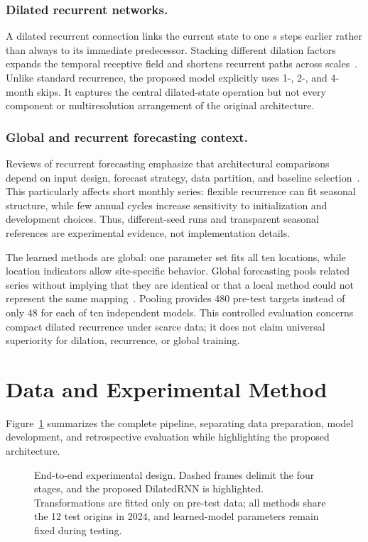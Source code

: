\documentclass[runningheads]{llncs}
\begin{document}
\subsubsection{Dilated recurrent networks.}
A dilated recurrent connection links the current state to one $s$ steps earlier rather than always to its immediate predecessor. Stacking different dilation factors expands the temporal receptive field and shortens recurrent paths across scales~\cite{chang2017}. Unlike standard recurrence, the proposed model explicitly uses 1-, 2-, and 4-month skips. It captures the central dilated-state operation but not every component or multiresolution arrangement of the original architecture.

\subsubsection{Global and recurrent forecasting context.}
Reviews of recurrent forecasting emphasize that architectural comparisons depend on input design, forecast strategy, data partition, and baseline selection~\cite{hewamalage2021}. This particularly affects short monthly series: flexible recurrence can fit seasonal structure, while few annual cycles increase sensitivity to initialization and development choices. Thus, different-seed runs and transparent seasonal references are experimental evidence, not implementation details.

The learned methods are global: one parameter set fits all ten locations, while location indicators allow site-specific behavior. Global forecasting pools related series without implying that they are identical or that a local method could not represent the same mapping~\cite{montero2021}. Pooling provides 480 pre-test targets instead of only 48 for each of ten independent models. This controlled evaluation concerns compact dilated recurrence under scarce data; it does not claim universal superiority for dilation, recurrence, or global training.

\section{Data and Experimental Method}
\label{sec:method}

Figure~\ref{fig:pipeline} summarizes the complete pipeline, separating data preparation, model development, and retrospective evaluation while highlighting the proposed architecture.

\begin{figure}[H]
\centering

\caption{End-to-end experimental design. Dashed frames delimit the four stages, and the proposed DilatedRNN is highlighted. Transformations are fitted only on pre-test data; all methods share the 12 test origins in 2024, and learned-model parameters remain fixed during testing.}
\label{fig:pipeline}
\end{figure}
\end{document}
